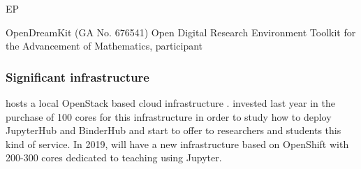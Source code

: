 \begin{sitedescription}{EP}
\begin{compactenum}
\item OpenDreamKit (GA No. 676541) Open Digital Research Environment
Toolkit for the Advancement of Mathematics, participant
\end{compactenum}

\subsubsection*{Significant infrastructure}

 hosts a local OpenStack based cloud infrastructure
.  invested last year in the purchase of 100 cores for this infrastructure in order to study how to deploy JupyterHub and BinderHub and start to offer to researchers and students this kind of service.
In 2019,  will have a new infrastructure based on OpenShift with 200-300 cores dedicated to teaching using Jupyter.

\end{sitedescription}
